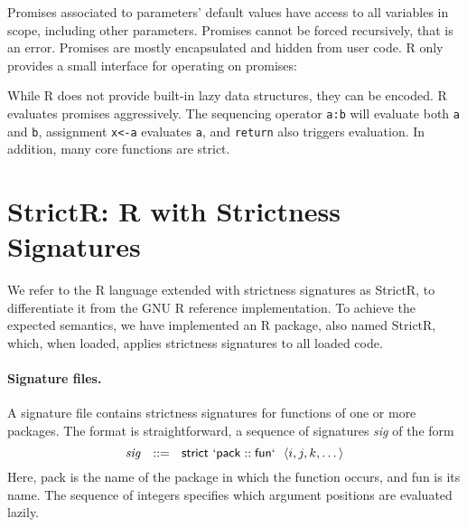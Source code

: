 \documentclass[review,creen,acmsmall]{acmart}
\newcommand{\code}[1]{\lstinline |#1|\xspace}
\newcommand{\strictr}{{\sf StrictR}\xspace}
\begin{document}
\noindent
Promises associated to parameters' default values have access to all variables
in scope, including other parameters. Promises cannot be forced recursively,
that is an error. Promises are mostly encapsulated and hidden from user code. R
only provides a small interface for operating on promises:

\noindent
While R does not provide built-in lazy data structures, they can be encoded. R
evaluates promises aggressively. The sequencing operator \code{a:b} will
evaluate both \code a and \code b, assignment \code{x<-a} evaluates \code a, and
\code{return} also triggers evaluation. In addition, many core functions are
strict.

\newpage %
\section{StrictR: R with Strictness Signatures}\label{sec:strictr}

We refer to the R language extended with strictness signatures as \strictr, to
differentiate it from the GNU R reference implementation. To achieve the
expected semantics, we have implemented an R package, also named \strictr,
which, when loaded, applies strictness signatures to all loaded code.

\paragraph{Signature files.}
A signature file contains strictness signatures for functions of one or more
packages. The format is straightforward, a sequence of signatures \emph{sig} of
the form
%
\[
\mathit{sig}~~::=~~\mathsf{strict}~\mathsf{`pack}::\mathsf{fun`}~~\langle i, j, k, \dots\rangle
\]
%
Here, {\sf pack} is the name of the package in which the function occurs, and {\sf
  fun} is its name. The sequence of integers specifies which argument positions
are evaluated lazily.
\end{document}
